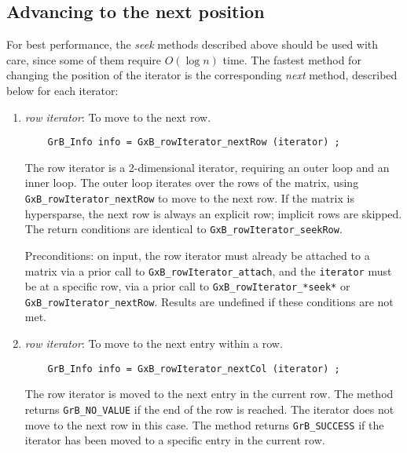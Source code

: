 \documentclass[12pt]{article}
\begin{document}
\subsection{Advancing to the next position}

For best performance, the {\em seek} methods described above should be used
with care, since some of them require $O(\log n)$ time.  The fastest method
for changing the position of the iterator is the corresponding {\em next}
method, described below for each iterator:

    \begin{enumerate}
    \item {\em row iterator}:  To move to the next row.

    {\footnotesize
    \begin{verbatim}
    GrB_Info info = GxB_rowIterator_nextRow (iterator) ; \end{verbatim}}

    The row iterator is a 2-dimensional iterator, requiring an outer loop and
    an inner loop.  The outer loop iterates over the rows of the matrix, using
    \verb'GxB_rowIterator_nextRow' to move to the next row.  If the matrix is
    hypersparse, the next row is always an explicit row; implicit rows are
    skipped.  The return conditions are identical to
    \verb'GxB_rowIterator_seekRow'.

    Preconditions: on input, the row iterator must already be attached to a
    matrix via a prior call to \verb'GxB_rowIterator_attach', and the
    \verb'iterator' must be at a specific row, via a prior call to
    \verb'GxB_rowIterator_*seek*' or \verb'GxB_rowIterator_nextRow'.
    Results are undefined if these conditions are not met.

    \item {\em row iterator}:  To move to the next entry within a row.

    {\footnotesize
    \begin{verbatim}
    GrB_Info info = GxB_rowIterator_nextCol (iterator) ; \end{verbatim}}

    The row iterator is moved to the next entry in the current row.
    The method returns \verb'GrB_NO_VALUE' if the end of the row is reached.
    The iterator does not move to the next row in this case.
    The method returns \verb'GrB_SUCCESS' if the iterator has been moved
    to a specific entry in the current row.


\end{enumerate}
\end{document}
